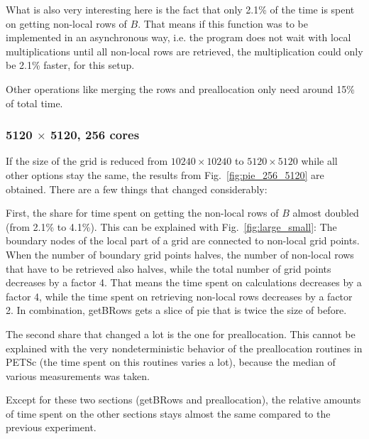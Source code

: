 What is also very interesting here is the fact that only 2.1\% of the time is spent on getting non-local rows of $B$. That means if this function was to be implemented in an asynchronous way, i.e. the program does not wait with local multiplications until all non-local rows are retrieved, the multiplication could only be 2.1\% faster, for this setup. 

Other operations like merging the rows and preallocation only need around 15\% of total time.



\subsubsection*{5120 $\times$ 5120, 256 cores}
If the size of the grid is reduced from $10240 \times 10240$ to $5120 \times 5120$ while all other options stay the same, the results from Fig.~\ref{fig:pie_256_5120} are obtained. There are a few things that changed considerably: 

First, the share for time spent on getting the non-local rows of $B$ almost doubled (from 2.1\% to 4.1\%). This can be explained with Fig.~\ref{fig:large_small}: The boundary nodes of the local part of a grid are connected to non-local grid points. When the number of boundary grid points halves, the number of non-local rows that have to be retrieved also halves, while the total number of grid points decreases by a factor 4. That means the time spent on calculations decreases by a factor 4, while the time spent on retrieving non-local rows decreases by a factor 2. In combination, getBRows gets a slice of pie that is twice the size of before. 

The second share that changed a lot is the one for preallocation. This cannot be explained with the very nondeterministic behavior of the preallocation routines in PETSc (the time spent on this routines varies a lot), because the median of various measurements was taken. 

Except for these two sections (getBRows and preallocation), the relative amounts of time spent on the other sections stays almost the same compared to the previous experiment.

